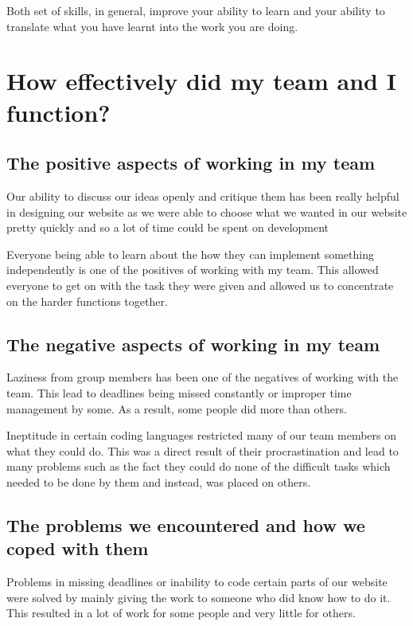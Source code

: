 \documentclass[12pt,a4paper]{article}
\begin{document}
Both set of skills, in general, improve your ability to learn and your ability to
translate what you have learnt into the work you are doing.

\newpage
\section{How effectively did my team and I\\ function?}

\subsection{The positive aspects of working in my team}

Our ability to discuss our ideas openly and critique them has been really helpful
in designing our website as we were able to choose what we wanted in our website
pretty quickly and so a lot of time could be spent on development

Everyone being able to learn about the how they can implement something independently
is one of the positives of working with my team. This allowed everyone to get on with 
the task they were given and allowed us to concentrate on the harder functions together. 

\subsection{The negative aspects of working in my team}

Laziness from group members has been one of the negatives of working with the team.
This lead to deadlines being missed constantly or improper time management by some.
As a result, some people did more than others.

Ineptitude in certain coding languages restricted many of our team members on what they could
do. This was a direct result of their procrastination and lead to many problems such as the fact
they could do none of the difficult tasks which needed to be done by them and instead, was placed
on others.

\newpage
\subsection{The problems we encountered and how we coped with them}

Problems in missing deadlines or inability to code certain parts of our website were solved
by mainly giving the work to someone who did know how to do it. This resulted in a lot of work
for some people and very little for others.
\end{document}
